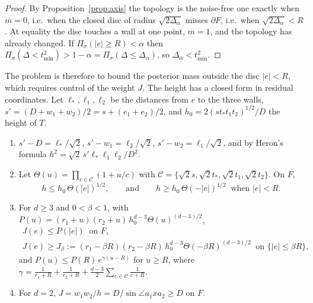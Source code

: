 \begin{proof}
By Proposition~\ref{prop:axis} the topology is the noise-free one exactly when $m = 0$, i.e.\ when the closed disc of
radius $\sqrt{2\Delta_\alpha}$ misses $\partial F$, i.e.\ when $\sqrt{2\Delta_\alpha} < R$. At equality the disc touches a
wall at one point, $m = 1$, and the topology has already changed. If $\Pi_\sigma(|e| \ge R) < \alpha$ then
$\Pi_\sigma(\Delta < t_{\min}^2) > 1 - \alpha = \Pi_\sigma(\Delta \le \Delta_\alpha)$, so $\Delta_\alpha < t_{\min}^2$.
\end{proof}

The problem is therefore to bound the posterior mass outside the disc $|e| < R$, which requires control of the weight
$J$. The height has a closed form in residual coordinates. Let $\ell_*, \ell_1, \ell_2$ be the distances from $e$ to the
three walls, $s' = (D + w_1 + w_2)/2 = s + (e_1 + e_2)/2$, and $h_0 = 2(st_*t_1t_2)^{1/2}/D$ the height of $T$.

\begin{lemma}\label{lem:weight}
\begin{enumerate}[label=(\roman*)]
\item $s' - D = \ell_*/\sqrt2$, $s' - w_1 = \ell_2/\sqrt2$, $s' - w_2 = \ell_1/\sqrt2$, and by Heron's formula
$h^2 = \sqrt2\,s'\ell_*\ell_1\ell_2/D^2$.
\item Let $\Theta(u) = \prod_{c \in \mathcal C}(1 + u/c)$ with $\mathcal C = \{\sqrt2 s, \sqrt2 t_*, \sqrt2 t_1, \sqrt2 t_2\}$. On $F$,
\[ h \le h_0\,\Theta(|e|)^{1/2}, \qquad\text{and}\qquad h \ge h_0\,\Theta(-|e|)^{1/2} \ \text{ when } |e| < R . \]
\item For $d \ge 3$ and $0 < \beta < 1$, with $P(u) = (r_1 + u)(r_2 + u)\,h_0^{d-3}\Theta(u)^{(d-3)/2}$,
\begin{gather*}
J(e) \le P(|e|) \ \text{ on } F, \\
J(e) \ge J_\beta := (r_1 - \beta R)(r_2 - \beta R)\,h_0^{d-3}\Theta(-\beta R)^{(d-3)/2} \ \text{ on } \{|e| \le \beta R\},
\end{gather*}
and $P(u) \le P(R)\,e^{\gamma(u - R)}$ for $u \ge R$, where
$\gamma = \frac{1}{r_1 + R} + \frac{1}{r_2 + R} + \frac{d-3}{2}\sum_{c \in \mathcal C}\frac{1}{c + R}$.
\item For $d = 2$, $J = w_1w_2/h = D/\sin\angle a_1 x a_2 \ge D$ on $F$.
\end{enumerate}
\end{lemma}

